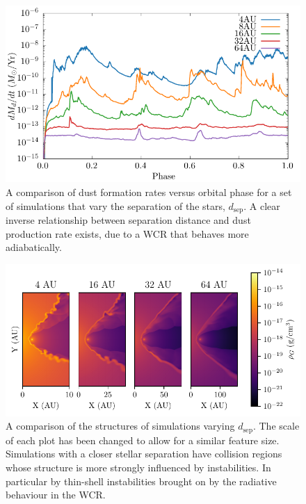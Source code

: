 \documentclass[fleqn,usenatbib]{mnras}
\begin{document}
\begin{figure}
  \centering
  \includegraphics[width=\linewidth]{assets/dsep-phase-dust_rate.pdf}
  \caption[Dust formation rate versus binary separation distance]{A comparison of dust formation rates versus orbital phase for a set of simulations that vary the separation of the stars, $d_\text{sep}$. A clear inverse relationship between separation distance and dust production rate exists, due to a WCR that behaves more adiabatically.}
  \label{fig:dsepdustproduction}
\end{figure}

\begin{figure}
  \centering
  \includegraphics{assets/adiabatic-flow/instab-comp-rho.pdf}
  \caption[A comparison of the structures of simulations varying $d_\text{sep}$]{A comparison of the structures of simulations varying $d_\text{sep}$. The scale of each plot has been changed to allow for a similar feature size. Simulations with a closer stellar separation have collision regions whose structure is more strongly influenced by instabilities. In particular by thin-shell instabilities brought on by the radiative behaviour in the WCR.}
  \label{fig:dsepinstabilities}
\end{figure}
\end{document}
